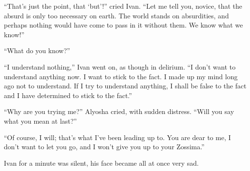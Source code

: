 ``That's just the point, that `but'!'' cried Ivan. ``Let me tell you,
novice, that the absurd is only too necessary on earth. The world
stands on absurdities, and perhaps nothing would have come to pass in
it without them. We know what we know!''

``What do you know?''

``I understand nothing,'' Ivan went on, as though in delirium. ``I
don't want to understand anything now. I want to stick to the fact. I
made up my mind long ago not to understand. If I try to understand
anything, I shall be false to the fact and I have determined to stick
to the fact.''

``Why are you trying me?'' Alyosha cried, with sudden distress. ``Will
you say what you mean at last?''

``Of course, I will; that's what I've been leading up to. You are dear
to me, I don't want to let you go, and I won't give you up to your
Zossima.''

Ivan for a minute was silent, his face became all at once very sad.

